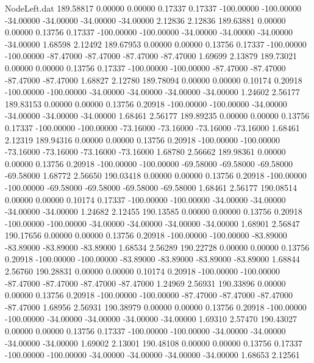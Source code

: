 \begin{filecontents}{NodeLeft.dat}
 189.58817    0.00000    0.00000     0.17337    0.17337 -100.00000 -100.00000  -34.00000  -34.00000  -34.00000  -34.00000    2.12836    2.12836
 189.63881    0.00000    0.00000     0.13756    0.17337 -100.00000 -100.00000  -34.00000  -34.00000  -34.00000  -34.00000    1.68598    2.12492
 189.67953    0.00000    0.00000     0.13756    0.17337 -100.00000 -100.00000  -87.47000  -87.47000  -87.47000  -87.47000    1.69699    2.13879
 189.73021    0.00000    0.00000     0.13756    0.17337 -100.00000 -100.00000  -87.47000  -87.47000  -87.47000  -87.47000    1.68827    2.12780
 189.78094    0.00000    0.00000     0.10174    0.20918 -100.00000 -100.00000  -34.00000  -34.00000  -34.00000  -34.00000    1.24602    2.56177
 189.83153    0.00000    0.00000     0.13756    0.20918 -100.00000 -100.00000  -34.00000  -34.00000  -34.00000  -34.00000    1.68461    2.56177
 189.89235    0.00000    0.00000     0.13756    0.17337 -100.00000 -100.00000  -73.16000  -73.16000  -73.16000  -73.16000    1.68461    2.12319
 189.94316    0.00000    0.00000     0.13756    0.20918 -100.00000 -100.00000  -73.16000  -73.16000  -73.16000  -73.16000    1.68780    2.56662
 189.98361    0.00000    0.00000     0.13756    0.20918 -100.00000 -100.00000  -69.58000  -69.58000  -69.58000  -69.58000    1.68772    2.56650
 190.03418    0.00000    0.00000     0.13756    0.20918 -100.00000 -100.00000  -69.58000  -69.58000  -69.58000  -69.58000    1.68461    2.56177
 190.08514    0.00000    0.00000     0.10174    0.17337 -100.00000 -100.00000  -34.00000  -34.00000  -34.00000  -34.00000    1.24682    2.12455
 190.13585    0.00000    0.00000     0.13756    0.20918 -100.00000 -100.00000  -34.00000  -34.00000  -34.00000  -34.00000    1.68901    2.56847
 190.17656    0.00000    0.00000     0.13756    0.20918 -100.00000 -100.00000  -83.89000  -83.89000  -83.89000  -83.89000    1.68534    2.56289
 190.22728    0.00000    0.00000     0.13756    0.20918 -100.00000 -100.00000  -83.89000  -83.89000  -83.89000  -83.89000    1.68844    2.56760
 190.28831    0.00000    0.00000     0.10174    0.20918 -100.00000 -100.00000  -87.47000  -87.47000  -87.47000  -87.47000    1.24969    2.56931
 190.33896    0.00000    0.00000     0.13756    0.20918 -100.00000 -100.00000  -87.47000  -87.47000  -87.47000  -87.47000    1.68956    2.56931
 190.38979    0.00000    0.00000     0.13756    0.20918 -100.00000 -100.00000  -34.00000  -34.00000  -34.00000  -34.00000    1.69310    2.57470
 190.43027    0.00000    0.00000     0.13756    0.17337 -100.00000 -100.00000  -34.00000  -34.00000  -34.00000  -34.00000    1.69002    2.13001
 190.48108    0.00000    0.00000     0.13756    0.17337 -100.00000 -100.00000  -34.00000  -34.00000  -34.00000  -34.00000    1.68653    2.12561

\end{filecontents}
